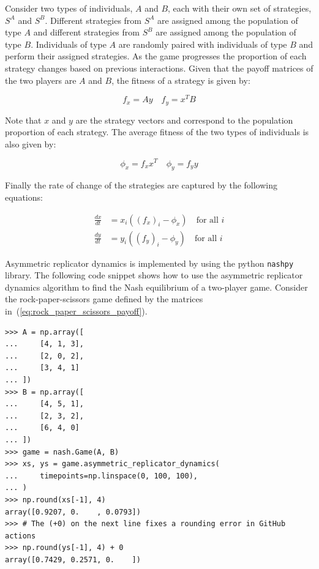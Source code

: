 Consider two types of individuals, \(A\) and \(B\), each with their own set of
strategies, \(S^A\) and \(S^B\).
Different strategies from \(S^A\) are assigned among the population of type
\(A\) and different strategies from \(S^B\) are assigned among the population
of type \(B\).
Individuals of type \(A\) are randomly paired with individuals of type \(B\)
and perform their assigned strategies.
As the game progresses the proportion of each strategy changes based on previous
interactions.
Given that the payoff matrices of the two players are \(A\) and \(B\), the
fitness of a strategy is given by:

\begin{equation}\label{eq:fitness_definition}
    f_x = A y \quad f_y = x^T B
\end{equation}

Note that \(x\) and \(y\) are the strategy vectors and correspond to the
population proportion of each strategy.
The average fitness of the two types of individuals is also given by:

\begin{equation}\label{eq:average_fitness_definition}
    \phi_x = f_x x^T \quad \phi_y = f_y y
\end{equation}

Finally the rate of change of the strategies are captured by the following
equations:

\begin{align}\label{eq:replicator_dynamics}
    \frac{dx}{dt} &= x_i((f_x)_i - \phi_x) \quad \text{for all } i \\
    \frac{dy}{dt} &= y_i((f_y)_i - \phi_y) \quad \text{for all } i
\end{align}

Asymmetric replicator dynamics is implemented by using the python
\lstinline[style=pystyle]{nashpy} library.
The following code snippet shows how to use the asymmetric replicator dynamics
algorithm to find the Nash equilibrium of a two-player game.
Consider the rock-paper-scissors game defined by the matrices
in~(\ref{eq:rock_paper_scissors_payoff}).

\begin{lstlisting}[style=pystyle]
>>> A = np.array([
...     [4, 1, 3],
...     [2, 0, 2],
...     [3, 4, 1]
... ])
>>> B = np.array([
...     [4, 5, 1],
...     [2, 3, 2],
...     [6, 4, 0]
... ])
>>> game = nash.Game(A, B)
>>> xs, ys = game.asymmetric_replicator_dynamics(
...     timepoints=np.linspace(0, 100, 100),
... )
>>> np.round(xs[-1], 4)
array([0.9207, 0.    , 0.0793])
>>> # The (+0) on the next line fixes a rounding error in GitHub actions
>>> np.round(ys[-1], 4) + 0
array([0.7429, 0.2571, 0.    ])

\end{lstlisting}

